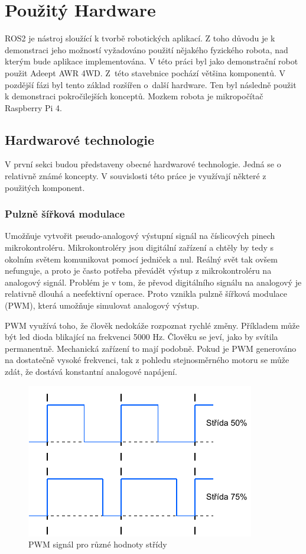 \chapter{Použitý Hardware}
ROS2 je nástroj sloužící k tvorbě robotických aplikací. Z toho důvodu je k demonstraci jeho možností vyžadováno použití nějakého fyzického robota, nad kterým bude aplikace implementována. V této práci byl jako demonstrační robot použit Adeept AWR 4WD. Z~této stavebnice pochází většina komponentů. V pozdější fázi byl tento základ rozšířen o~další hardware. Ten byl následně použit k demonstraci pokročilejších konceptů. Mozkem robota je mikropočítač Raspberry Pi 4.

\section{Hardwarové technologie}
V první sekci budou představeny obecné hardwarové technologie. Jedná se o relativně známé koncepty. V souvislosti této práce je využívají některé z použitých komponent.

\subsection*{Pulzně šířková modulace} 
Umožňuje vytvořit pseudo-analogový výstupní signál na číslicových pinech mikrokontroléru. Mikrokontroléry jsou digitální zařízení a chtěly by tedy s okolním světem komunikovat pomocí jedniček a nul. Reálný svět tak ovšem nefunguje, a proto je často potřeba převádět výstup z mikrokontroléru na analogový signál. Problém je v tom, že převod digitálního signálu na analogový je relativně dlouhá a neefektivní operace. Proto vznikla pulzně šířková modulace (PWM), která umožňuje simulovat analogový výstup.

PWM využívá toho, že člověk nedokáže rozpoznat rychlé změny. Příkladem může být led dioda blikající na frekvenci 5000 Hz. Člověku se jeví, jako by svítila permanentně. Mechanická zařízení to mají podobně. Pokud je PWM generováno na dostatečně vysoké frekvenci, tak z pohledu stejnosměrného motoru se může zdát, že dostává konstantní analogové napájení.

\begin{figure}[h!]
	\centering
	\includegraphics[scale=1.2]{obrazky-figures/pwm_duty_cycle.pdf}
	\caption{PWM signál pro různé hodnoty střídy}
	\label{fig:pwm}
\end{figure}

